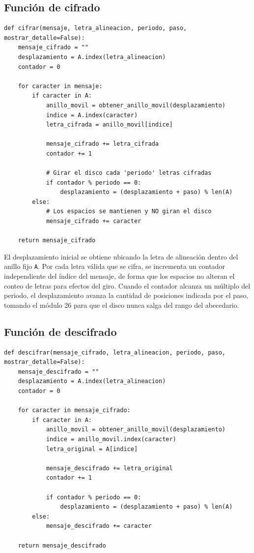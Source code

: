 \documentclass[letterpaper,12pt]{article}
\begin{document}
\subsection{Función de cifrado}

\begin{lstlisting}[style=pythonstyle]
def cifrar(mensaje, letra_alineacion, periodo, paso, mostrar_detalle=False):
    mensaje_cifrado = ""
    desplazamiento = A.index(letra_alineacion)
    contador = 0

    for caracter in mensaje:
        if caracter in A:
            anillo_movil = obtener_anillo_movil(desplazamiento)
            indice = A.index(caracter)
            letra_cifrada = anillo_movil[indice]

            mensaje_cifrado += letra_cifrada
            contador += 1

            # Girar el disco cada 'periodo' letras cifradas
            if contador % periodo == 0:
                desplazamiento = (desplazamiento + paso) % len(A)
        else:
            # Los espacios se mantienen y NO giran el disco
            mensaje_cifrado += caracter

    return mensaje_cifrado
\end{lstlisting}

El desplazamiento inicial se obtiene ubicando la letra de alineación dentro del anillo fijo
\texttt{A}. Por cada letra válida que se cifra, se incrementa un contador independiente del
índice del mensaje, de forma que los espacios no alteran el conteo de letras para efectos
del giro. Cuando el contador alcanza un múltiplo del periodo, el desplazamiento avanza la
cantidad de posiciones indicada por el paso, tomando el módulo 26 para que el disco nunca
salga del rango del abecedario.

\subsection{Función de descifrado}

\begin{lstlisting}[style=pythonstyle]
def descifrar(mensaje_cifrado, letra_alineacion, periodo, paso, mostrar_detalle=False):
    mensaje_descifrado = ""
    desplazamiento = A.index(letra_alineacion)
    contador = 0

    for caracter in mensaje_cifrado:
        if caracter in A:
            anillo_movil = obtener_anillo_movil(desplazamiento)
            indice = anillo_movil.index(caracter)
            letra_original = A[indice]

            mensaje_descifrado += letra_original
            contador += 1

            if contador % periodo == 0:
                desplazamiento = (desplazamiento + paso) % len(A)
        else:
            mensaje_descifrado += caracter

    return mensaje_descifrado
\end{lstlisting}
\end{document}
